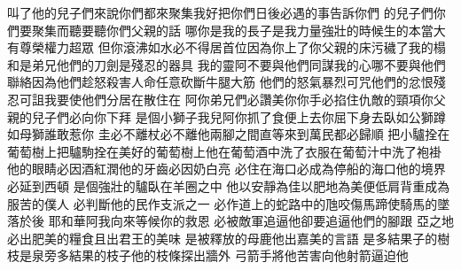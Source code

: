 \bchapter%
叫了他的兒子們來\chientien 說\chientien 你們都來聚集\chientien 我好把你們日後必遇的事告訴你們\chuan 
{}的兒子們\chientien 你們要聚集而聽\chientien 要聽你們父親的話\chuan\Chuan
{}哪\chientien 你是我的長子\chientien 是我力量強壯的時候生的\chientien 本當大有尊榮\chientien 權力超眾\yuentien 
{}但你\chientien 滾沸如水\chientien 必不得居首位\chientien 因為你上了你父親的床\chientien 污穢了我的榻\chuan\Chuan
{}和是弟兄\chientien 他們的刀劍是殘忍的器具\chuan 
{}我的靈阿\chientien 不要與他們同謀\chientien 我的心哪\chientien 不要與他們聯絡\chientien 因為他們趁怒殺害人命\chientien 任意砍斷牛腿大筋\yuentien 
{}他們的怒氣暴烈可咒\yuentien 他們的忿恨殘忍可詛\yuentien 我要使他們分居在\chientien 散住在\chuan\Chuan
{}阿\chientien 你弟兄們必讚美你\chientien 你手必掐住仇敵的頸項\chientien 你父親的兒子們必向你下拜\chuan 
{}是個小獅子\yuentien 我兒阿\chientien 你抓了食便上去\yuentien 你屈下身去\chientien 臥如公獅\chientien 蹲如母獅\chientien 誰敢惹你\chuan 
{}圭必不離\chientien 杖必不離他兩腳之間\chientien 直等來到\chientien 萬民都必歸順\chuan 
{}把小驢拴在葡萄樹上\chientien 把驢駒拴在美好的葡萄樹上\chientien 他在葡萄酒中洗了衣服\chientien 在葡萄汁中洗了袍褂\chuan 
{}他的眼睛必因酒紅潤\chientien 他的牙齒必因奶白亮\chuan\Chuan
{}必住在海口\chientien 必成為停船的海口\yuentien 他的境界必延到西頓\chuan\Chuan
{}是個強壯的驢\chientien 臥在羊圈之中\yuentien 
{}他以安靜為佳\chientien 以肥地為美\chientien 便低肩背重\chientien 成為服苦的僕人\chuan\Chuan
{}必判斷他的民\chientien 作支派之一\chuan 
{}必作道上的蛇\chientien 路中的虺\chientien 咬傷馬蹄\chientien 使騎馬的墜落於後\chuan 
{}耶和華阿\chientien 我向來等候你的救恩\chuan\Chuan
{}必被敵軍追逼\chientien 他卻要追逼他們的腳跟\chuan\Chuan
{}亞之地必出肥美的糧食\chientien 且出君王的美味\chuan\Chuan
{}是被釋放的母鹿\chientien 他出嘉美的言語\chuan\Chuan
{}是多結果子的樹枝\chientien 是泉旁多結果的枝子\chientien 他的枝條探出牆外\chuan 
{}弓箭手將他苦害\chientien 向他射箭\chientien 逼迫他\yuentien 
